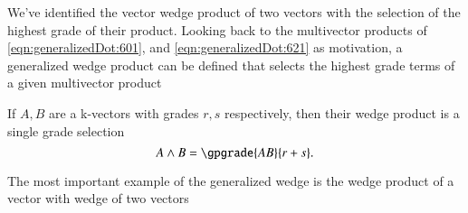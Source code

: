 %
%
We've identified the vector wedge product of two vectors with the selection of the highest grade of their product.
Looking back to the multivector products of \cref{eqn:generalizedDot:601}, and \cref{eqn:generalizedDot:621} as motivation,
a generalized wedge product can be defined that selects the highest grade terms of a given multivector product


If \( A, B \) are a k-vectors with grades \( r, s \) respectively, then their wedge product is a single grade selection
\begin{dmath}\label{eqn:generalizedWedge:560}
A \wedge B = \gpgrade{ A B }{ r + s}.
\end{dmath}

The most important example of the generalized wedge is the wedge product of a vector with wedge of two vectors


